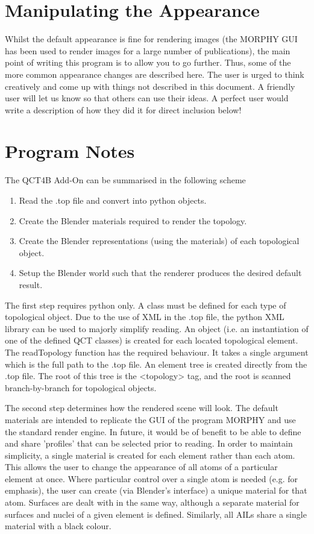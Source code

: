 \documentclass{report}
\begin{document}
\chapter{Manipulating the Appearance}

Whilst the default appearance is fine for rendering images (the MORPHY GUI has been used to render images for a large number of publications), the main point of writing this program is to allow you to go further.
Thus, some of the more common appearance changes are described here. 
The user is urged to think creatively and come up with things not described in this document.
A friendly user will let us know so that others can use their ideas.
A perfect user would write a description of how they did it for direct inclusion below!

\chapter{Program Notes}

The QCT4B Add-On can be summarised in the following scheme

\begin{enumerate}

  \item Read the .top file and convert into python objects.
  \item Create the Blender materials required to render the topology.
  \item Create the Blender representations (using the materials) of each topological object.
  \item Setup the Blender world such that the renderer produces the desired default result.

\end{enumerate}

The first step requires python only. A class must be defined for each type of topological object.
Due to the use of XML in the .top file, the python XML library can be used to majorly simplify reading.
An object (i.e. an instantiation of one of the defined QCT classes) is created for each located topological element.
The readTopology function has the required behaviour. It takes a single argument which is the full path to the .top file.
An element tree is created directly from the .top file. The root of this tree is the <topology> tag, and the root is scanned branch-by-branch for topological objects.


The second step determines how the rendered scene will look.
The default materials are intended to replicate the GUI of the program MORPHY and use the standard render engine.
In future, it would be of benefit to be able to define and share 'profiles' that can be selected prior to reading.
In order to maintain simplicity, a single material is created for each element rather than each atom.
This allows the user to change the appearance of all atoms of a particular element at once.
Where particular control over a single atom is needed (e.g. for emphasis), the user can create (via Blender's interface) a unique material for that atom.
Surfaces are dealt with in the same way, although a separate material for surfaces and nuclei of a given element is defined.
Similarly, all AILs share a single material with a black colour.
\end{document}
